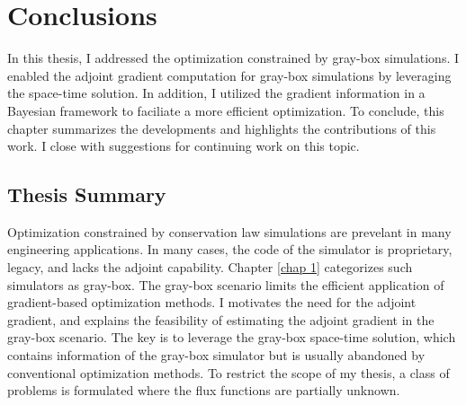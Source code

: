 \chapter{Conclusions}
In this thesis, I addressed the optimization constrained by gray-box simulations.
I enabled the adjoint gradient computation for gray-box simulations by leveraging the
space-time solution. In addition, I utilized the gradient information in a Bayesian
framework to faciliate a more efficient optimization. 
To conclude, this chapter summarizes the developments and highlights
the contributions of this work. I close with suggestions for continuing work
on this topic.


\section{Thesis Summary}
Optimization constrained by conservation law simulations are prevelant in many engineering
applications.
In many cases, the code of the simulator is proprietary, legacy, and
lacks the adjoint capability. 
Chapter \ref{chap 1} categorizes such simulators as gray-box.
The gray-box scenario limits the efficient application 
of gradient-based optimization methods.
I motivates the need for the
adjoint gradient, and explains the feasibility
of estimating the adjoint gradient in the gray-box scenario.
The key is to leverage the gray-box space-time solution, which contains information
of the gray-box simulator but is usually abandoned by conventional optimization methods.
To restrict the scope of my thesis, a class of problems is formulated where the
flux functions are partially unknown.\\

